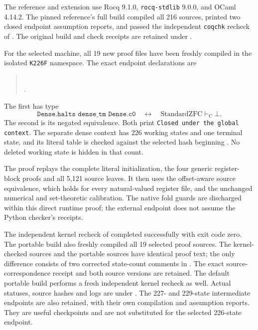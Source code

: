 The reference and extension use Rocq 9.1.0, \texttt{rocq-stdlib} 9.0.0,
and OCaml 4.14.2. The pinned reference's full build compiled all 216
sources, printed two closed endpoint assumption reports, and passed the
independent \texttt{coqchk} recheck of
. The original build and check receipts are retained
under .

For the selected machine, all 19 new proof files have been freshly
compiled in the isolated \texttt{K226F} namespace. The exact endpoint
declarations are
\begin{quote}\small
{}\\[3pt]
.
\end{quote}
The first has type
\[
 \texttt{Dense.halts dense\_tm Dense.c0}
       \quad\longleftrightarrow\quad
       \mathrm{StandardZFC}\vdash_{\mathrm C}\bot.
\]
The second is its negated equivalence. Both print
\texttt{Closed under the global context}. The separate dense context has
226 working states and one terminal state, and its literal table is
checked against the selected hash beginning . No deleted
working state is hidden in that count.

The proof replays the complete literal initialization, the four generic
register-block proofs and all 5,121 source leaves. It then uses the
offset-aware source equivalence, which holds for every natural-valued
register file, and the unchanged numerical and set-theoretic calibration.
The native fold guards are discharged within this direct runtime proof;
the external endpoint does not assume the Python checker's receipts.

The independent kernel recheck of
 completed successfully with exit code zero.
The portable build also freshly compiled all 19 selected proof sources.
The kernel-checked sources and the portable sources have identical proof
text; the only difference consists of two corrected state-count comments
in . The exact source-correspondence receipt and both
source versions are retained. The default portable build performs a fresh
independent kernel recheck as well. Actual statuses, source hashes and logs
are under .
The 227- and 229-state intermediate endpoints are also retained, with
their own compilation and assumption reports. They are useful checkpoints
and are not substituted for the selected 226-state endpoint.

